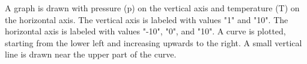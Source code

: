A graph is drawn with pressure (p) on the vertical axis and temperature (T) on the horizontal axis. The vertical axis is labeled with values "1" and "10". The horizontal axis is labeled with values "-10", "0", and "10". A curve is plotted, starting from the lower left and increasing upwards to the right. A small vertical line is drawn near the upper part of the curve.